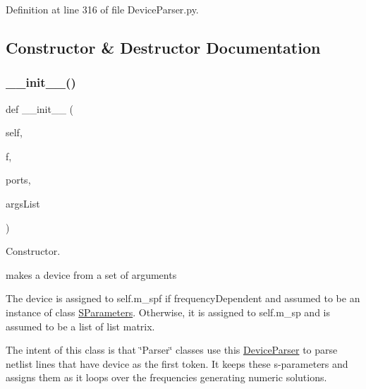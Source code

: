 Definition at line 316 of file Device\+Parser.\+py.



\subsection{Constructor \& Destructor Documentation}
\mbox{\label{classSignalIntegrity_1_1Parsers_1_1Devices_1_1DeviceParser_1_1DeviceParser_a286a7f15e5aa7761d219f91accd234c1}} 
\subsubsection{\texorpdfstring{\+\_\+\+\_\+init\+\_\+\+\_\+()}{\_\_init\_\_()}}
{\footnotesize\ttfamily def \+\_\+\+\_\+init\+\_\+\+\_\+ (\begin{DoxyParamCaption}\item[{}]{self,  }\item[{}]{f,  }\item[{}]{ports,  }\item[{}]{args\+List }\end{DoxyParamCaption})}



Constructor. 

makes a device from a set of arguments

The device is assigned to self.\+m\+\_\+spf if frequency\+Dependent and assumed to be an instance of class \hyperlink{namespaceSignalIntegrity_1_1SParameters}{S\+Parameters}. Otherwise, it is assigned to self.\+m\+\_\+sp and is assumed to be a list of list matrix.

The intent of this class is that \char`\"{}\+Parser\char`\"{} classes use this \hyperlink{classSignalIntegrity_1_1Parsers_1_1Devices_1_1DeviceParser_1_1DeviceParser}{Device\+Parser} to parse netlist lines that have \textquotesingle{}device\textquotesingle{} as the first token. It keeps these s-\/parameters and assigns them as it loops over the frequencies generating numeric solutions.


